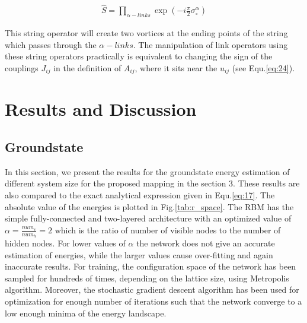 \documentclass{article}
\begin{document}
\begin{equation}\label{eq:29}
	\begin{aligned}
		\hat{S} = \prod_{\alpha-links} \exp{(-i\frac{\pi}{2}\sigma^\alpha_\circ)}
		\end{aligned}
\end{equation}

This string operator will create two vortices at the ending points of the string which passes through the $\alpha-links$. The manipulation of link operators using these string operators practically is equivalent to changing the sign of the couplings $J_{ij}$ in the definition of $A_{ij}$, where it sits near the $u_{ij}$ (see Equ.\hspace{0.2mm}\ref{eq:24}).

\section{Results and Discussion}


\subsection{Groundstate}

In this section, we present the results for the groundstate energy estimation of different system size for the proposed mapping in the section 3. These results are also compared to the exact analytical expression given in Equ.\hspace{0.2mm}\ref{eq:17}. The absolute value of the energies is plotted in Fig.\hspace{0.2mm}\ref{tab:r_space}. The RBM has the simple fully-connected and two-layered architecture with an optimized value of $\alpha = \frac{num_{v}}{num_{h}} = 2$ which is the ratio of number of visible nodes to the number of hidden nodes. For lower values of $\alpha$ the network does not give an accurate estimation of energies, while the larger values cause over-fitting and again inaccurate results. For training, the configuration space of the network has been sampled for hundreds of  times, depending on the lattice size, using Metropolis algorithm. Moreover, the stochastic gradient descent algorithm has been used for optimization for enough number of iterations such that the network converge to a low enough minima of the energy landscape.
\end{document}
